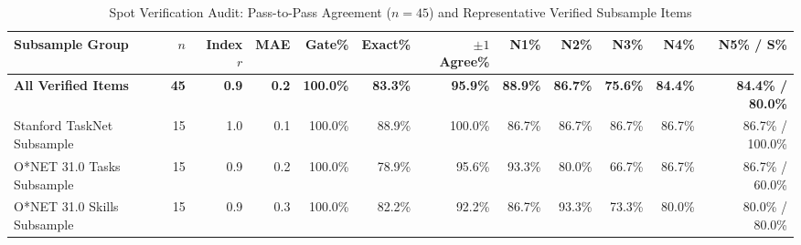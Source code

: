 \documentclass[9pt,letterpaper]{extarticle}
\begin{document}
\vspace{-5pt}
\begin{table}[h!]
\centering
\caption{Spot Verification Audit: Pass-to-Pass Agreement ($n=45$) and Representative Verified Subsample Items}
\label{tab:spot_summary}
\scriptsize
\begin{tabularx}{\textwidth}{@{}l r r r r r r r r r r r@{}}
\toprule
\textbf{Subsample Group} & \textbf{$n$} & \textbf{Index $r$} & \textbf{MAE} & \textbf{Gate\%} & \textbf{Exact\%} & \textbf{$\pm 1$ Agree\%} & \textbf{N1\%} & \textbf{N2\%} & \textbf{N3\%} & \textbf{N4\%} & \textbf{N5\% / S\%} \\
\midrule
\textbf{All Verified Items} & \textbf{45} & \textbf{0.9} & \textbf{0.2} & \textbf{100.0\%} & \textbf{83.3\%} & \textbf{95.9\%} & \textbf{88.9\%} & \textbf{86.7\%} & \textbf{75.6\%} & \textbf{84.4\%} & \textbf{84.4\% / 80.0\%} \\
Stanford TaskNet Subsample & 15 & 1.0 & 0.1 & 100.0\% & 88.9\% & 100.0\% & 86.7\% & 86.7\% & 86.7\% & 86.7\% & 86.7\% / 100.0\% \\
O*NET 31.0 Tasks Subsample & 15 & 0.9 & 0.2 & 100.0\% & 78.9\% & 95.6\% & 93.3\% & 80.0\% & 66.7\% & 86.7\% & 86.7\% / 60.0\% \\
O*NET 31.0 Skills Subsample & 15 & 0.9 & 0.3 & 100.0\% & 82.2\% & 92.2\% & 86.7\% & 93.3\% & 73.3\% & 80.0\% & 80.0\% / 80.0\% \\
\bottomrule
\end{tabularx}


\end{table}
\end{document}
